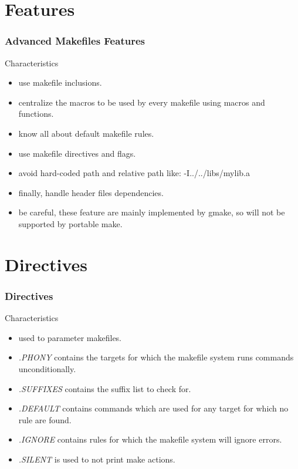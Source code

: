 \documentclass{beamer}
\begin{document}
%
%

\section{Features}


\begin{frame}
  \frametitle{Advanced Makefiles Features}

  \begin{block}{Characteristics}
    \begin{itemize}
      \item<1->
        use makefile inclusions.
      \item<1->
        centralize the macros to be used by every makefile using
        macros and functions.
      \item<1->
        know all about default makefile rules.
      \item<1->
        use makefile directives and flags.
      \item<1->
        avoid hard-coded path and relative path like: -I../../libs/mylib.a
      \item<1->
        finally, handle header files dependencies.
      \item<2->
        be careful, these feature are mainly implemented by \alert{gmake},
        so will not be supported by portable make.
    \end{itemize}
  \end{block}

\end{frame}

%
%

\section{Directives}


\begin{frame}
  \frametitle{Directives}

  \begin{block}{Characteristics}
    \begin{itemize}
      \item
        used to parameter makefiles.
      \item
        \textit{.PHONY} contains the targets for which the makefile system
        runs commands unconditionally.
      \item
        \textit{.SUFFIXES} contains the suffix list to check for.
      \item
        \textit{.DEFAULT} contains commands which are used for any target
        for which no rule are found.
      \item
        \textit{.IGNORE} contains rules for which the makefile system
        will ignore errors.
      \item
        \textit{.SILENT} is used to not print make actions.
    \end{itemize}
  \end{block}

\end{frame}
\end{document}
